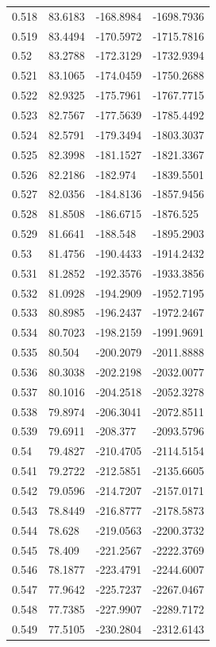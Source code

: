 \begin{tabular}{llll}
0.518 & 83.6183 & -168.8984 & -1698.7936 \\
0.519 & 83.4494 & -170.5972 & -1715.7816 \\
0.52 & 83.2788 & -172.3129 & -1732.9394 \\
0.521 & 83.1065 & -174.0459 & -1750.2688 \\
0.522 & 82.9325 & -175.7961 & -1767.7715 \\
0.523 & 82.7567 & -177.5639 & -1785.4492 \\
0.524 & 82.5791 & -179.3494 & -1803.3037 \\
0.525 & 82.3998 & -181.1527 & -1821.3367 \\
0.526 & 82.2186 & -182.974 & -1839.5501 \\
0.527 & 82.0356 & -184.8136 & -1857.9456 \\
0.528 & 81.8508 & -186.6715 & -1876.525 \\
0.529 & 81.6641 & -188.548 & -1895.2903 \\
0.53 & 81.4756 & -190.4433 & -1914.2432 \\
0.531 & 81.2852 & -192.3576 & -1933.3856 \\
0.532 & 81.0928 & -194.2909 & -1952.7195 \\
0.533 & 80.8985 & -196.2437 & -1972.2467 \\
0.534 & 80.7023 & -198.2159 & -1991.9691 \\
0.535 & 80.504 & -200.2079 & -2011.8888 \\
0.536 & 80.3038 & -202.2198 & -2032.0077 \\
0.537 & 80.1016 & -204.2518 & -2052.3278 \\
0.538 & 79.8974 & -206.3041 & -2072.8511 \\
0.539 & 79.6911 & -208.377 & -2093.5796 \\
0.54 & 79.4827 & -210.4705 & -2114.5154 \\
0.541 & 79.2722 & -212.5851 & -2135.6605 \\
0.542 & 79.0596 & -214.7207 & -2157.0171 \\
0.543 & 78.8449 & -216.8777 & -2178.5873 \\
0.544 & 78.628 & -219.0563 & -2200.3732 \\
0.545 & 78.409 & -221.2567 & -2222.3769 \\
0.546 & 78.1877 & -223.4791 & -2244.6007 \\
0.547 & 77.9642 & -225.7237 & -2267.0467 \\
0.548 & 77.7385 & -227.9907 & -2289.7172 \\
0.549 & 77.5105 & -230.2804 & -2312.6143 \\

\end{tabular}
